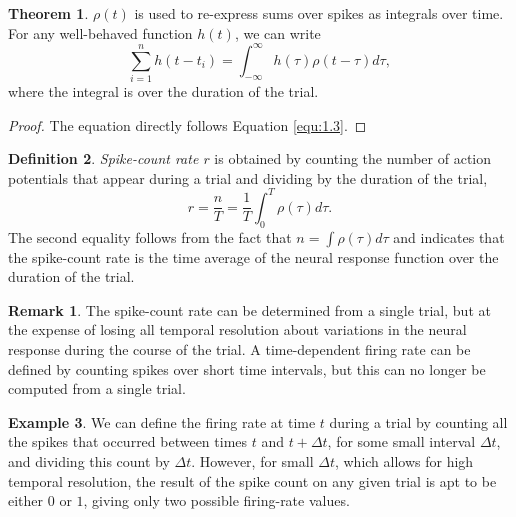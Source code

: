 \documentclass[letterpaper,oneside]{book}
\numberwithin{equation}{chapter}
\theoremstyle{definition}
\newtheorem{thm}{Theorem}[chapter]
\newtheorem{defn}[thm]{Definition}
\newtheorem{exm}[thm]{Example}
\newtheorem{rem}{Remark}[chapter]
\begin{document}
\begin{multicols}{2}
\begin{thm}
  $\rho(t)$ is used to re-express sums over spikes as integrals over time. For any 
  well-behaved function $h(t)$, we can write
  \begin{equation}
    \label{equ:1.2}
    \sum_{i=1}^n h(t-t_i)=\int_{-\infty}^{\infty}h(\tau)\rho(t-\tau)d\tau,
  \end{equation}
  where the integral is over the duration of the trial.
  \begin{proof}
    The equation directly follows Equation \ref{equ:1.3}.
  \end{proof}
\end{thm}

\begin{defn}
  \emph{Spike-count rate $r$} is obtained by counting the number of action potentials that appear during a trial and
  dividing by the duration of the trial,
  \begin{equation}
    r=\frac{n}{T}=\frac{1}{T}\int_0^T\rho(\tau)d\tau.
  \end{equation}
  The second equality follows from the fact that $n=\int\rho(\tau)d\tau$ and indicates
that the spike-count rate is the time average of the neural response function over the 
duration of the trial.
\end{defn}


\begin{rem}
  The spike-count rate can be determined from a single trial, but at the expense of 
  losing all temporal resolution about variations in the neural response during the 
  course of the trial. A time-dependent firing rate can be defined by counting spikes 
  over short time intervals, but this can no longer
be computed from a single trial.
\end{rem}

\begin{exm}
  We can define the firing rate
at time $t$ during a trial by counting all the spikes that occurred between
times $t$ and $t + \Delta t$, for some small interval $\Delta t$, and dividing this count by
$\Delta t$. However, for small $\Delta t$, which allows for high temporal resolution, the
result of the spike count on any given trial is apt to be either $0$ or $1$, giving
only two possible firing-rate values.
\end{exm}


\end{multicols}
\end{document}
